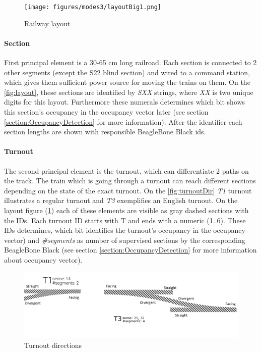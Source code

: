 \begin{figure}[h]
	\centering
	\texttt{[image: figures/modes3/layoutBig1.png]}
	\caption{Railway layout}
	\label{fig:layout}
\end{figure}

\paragraph{Section} 
First principal element is a 30-65 cm long railroad. Each section is connected to 2 other segments (except the S22 blind section) and wired to a command station, which gives them sufficient power source for moving the trains on them. On the \autoref{fig:layout}, these sections are identified by \textit{SXX} strings, where \textit{XX} is two unique digits for this layout. Furthermore these numerals determines which bit shows this section's occupancy in the occupancy vector later (see section \ref{section:OccupancyDetection} for more information). After the identifier each section lengths are shown with responsible BeagleBone Black ids.

\paragraph{Turnout}
The second principal element is the turnout, which can differentiate 2 paths on the track. The train which is going through a turnout can reach different sections depending on the state of the exact turnout. On the \autoref{fig:turnoutDir} \textit{T1} turnout illustrates a regular turnout and \textit{T3} exemplifies an English turnout. On the layout figure (\ref{fig:layout}) each of these elements are visible as gray dashed sections with the IDs. Each turnout ID starts with T and ends with a numeric (1..6). These IDs determines, which bit identifies the turnout's occupancy in the occupancy vector) and \textit{\#segments} as number of supervised sections by the corresponding BeagleBone Black (see section \ref{section:OccupancyDetection} for more information about occupancy vector). 

\begin{figure}[!h]
	\centering
	\includegraphics[width=150mm]{figures/modes3/t1andt3.png}
	\caption{Turnout directions}
	\label{fig:turnoutDir}
\end{figure}

